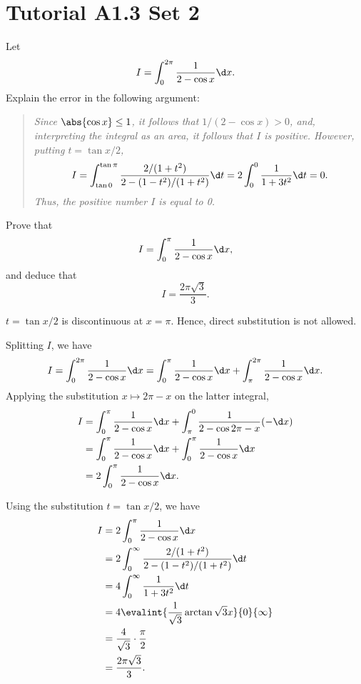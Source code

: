 \section{Tutorial A1.3 Set 2}

\begin{problem}
    Let \[I = \int_0^{2\pi} \frac{1}{2 - \cos x} \d x.\] Explain the error in the following argument:

    \begin{quote}\itshape
        Since $\abs{\cos x} \leq 1$, it follows that $1/(2-\cos x) > 0$, and, interpreting the integral as an area, it follows that $I$ is positive. However, putting $t = \tan{x/2}$, \[I = \int_{\tan 0}^{\tan \pi} \frac{2/(1+t^2)}{2 - (1-t^2)/(1 + t^2)} \d t = 2\int_0^0 \frac{1}{1 + 3t^2} \d t = 0.\] Thus, the positive number $I$ is equal to 0.
    \end{quote}

    Prove that \[I = \int_0^\pi \frac1{2 - \cos x} \d x,\] and deduce that \[I = \frac{2\pi\sqrt3}{3}.\]
\end{problem}
\begin{solution}
    $t = \tan{x/2}$ is discontinuous at $x = \pi$. Hence, direct substitution is not allowed.

    Splitting $I$, we have \[I = \int_0^{2\pi} \frac1{2 - \cos x} \d x = \int_0^{\pi} \frac1{2 - \cos x} \d x + \int_{\pi}^{2\pi} \frac1{2 - \cos x} \d x.\] Applying the substitution $x \mapsto 2\pi - x$ on the latter integral,
    \begin{align*}
        I &= \int_0^{\pi} \frac1{2 - \cos x} \d x + \int_{\pi}^0 \frac1{2 - \cos{2\pi - x}} (-\d x)\\
        &= \int_0^{\pi} \frac1{2 - \cos x} \d x + \int_0^{\pi} \frac1{2 - \cos x} \d x\\
        &= 2 \int_0^{\pi} \frac1{2 - \cos x} \d x.
    \end{align*}

    Using the substitution $t = \tan{x/2}$, we have
    \begin{align*}
        I &= 2\int_0^{\pi} \frac1{2 - \cos x} \d x\\
        &= 2\int_0^{\infty} \frac{2/(1+t^2)}{2 - (1-t^2)/(1 + t^2)} \d t\\
        &= 4\int_0^\infty \frac1{1 + 3t^2} \d t\\
        &= 4 \evalint{\frac1{\sqrt3} \arctan{\sqrt3 x}}{0}{\infty}\\
        &= \frac{4}{\sqrt3} \cdot \frac\pi2\\
        &= \frac{2\pi \sqrt3}3.\
    \end{align*}
\end{solution}

